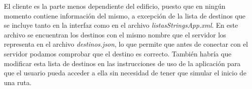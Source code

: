 El cliente es la parte menos dependiente del edificio, puesto que en ningún momento contiene información del mismo, a excepción de la lista de destinos que se incluye tanto en la interfaz como en el archivo \textit{listasStringsApp.xml}. En este archivo se encuentran los destinos con el mismo nombre que el servidor los representa en el archivo \textit{destinos.json}, lo que permite que antes de conectar con el servidor podamos comprobar que el destino es correcto. También habría que modificar esta lista de destinos en las instrucciones de uso de la aplicación para que el usuario pueda acceder a ella sin necesidad de tener que simular el inicio de una ruta.



